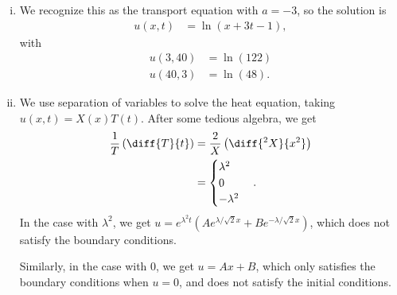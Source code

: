 \documentclass[10pt]{mypackage}
\begin{document}
\begin{solution}\hfill
  \begin{enumerate}[(i)]
    \item We recognize this as the transport equation with $a = -3$, so the solution is
      \begin{align*}
        u\left( x,t \right) &= \ln\left( x + 3t - 1 \right),
      \end{align*}
      with
      \begin{align*}
        u\left( 3,40 \right) &= \ln\left( 122 \right)\\
        u\left( 40,3 \right) &= \ln\left( 48 \right).
      \end{align*}
    \item We use separation of variables to solve the heat equation, taking $u\left( x,t \right) = X(x)T(t)$. After some tedious algebra, we get
      \begin{align*}
        \frac{1}{T}\left( \diff{T}{t} \right) &= \frac{2}{X}\left( \diff{^2X}{x^2} \right)\\
                                              &= \begin{cases}
                                                \lambda^2\\
                                                0\\
                                                -\lambda^2
                                              \end{cases}.
      \end{align*}
      In the case with $\lambda^2$, we get $u = e^{\lambda^2 t}\left( Ae^{\lambda/\sqrt{2} x} + Be^{-\lambda/\sqrt{2} x} \right)$, which does not satisfy the boundary conditions.\newline

      Similarly, in the case with $0$, we get $u = Ax + B$, which only satisfies the boundary conditions when $u = 0$, and does not satisfy the initial conditions.\newline


\end{enumerate}
\end{solution}
\end{document}
